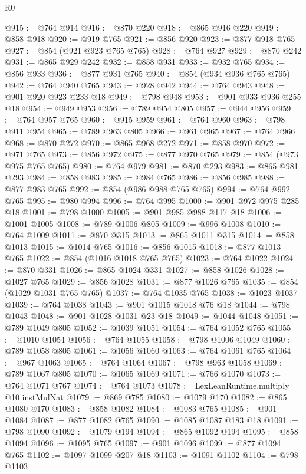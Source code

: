 \begin{lexlean}{R0}
\begin{coremodule}
{{{{{@915 := @764 @914
@916 := @870 @220
@918 := @865 @916 @220
@919 := @858 @918
@920 := @919 @765
@921 := @856 @920
@923 := @877 @918 @765
@927 := @854 (@921 @923 @765 @765)
@928 := @764 @927
@929 := @870 @242
@931 := @865 @929 @242
@932 := @858 @931
@933 := @932 @765
@934 := @856 @933
@936 := @877 @931 @765
@940 := @854 (@934 @936 @765 @765)
@942 := @764 @940 @765
@943 := @928 @942
@944 := @764 @943
@948 := @901 @920 @923 @233 @18
@949 := @798 @948
@953 := @901 @933 @936 @255 @18
@954 := @949 @953
@956 := @789 @954 @805
@957 := @944 @956
@959 := @764 @957 @765
@960 := @915 @959
@961 := @764 @960
@963 := @798 @911 @954
@965 := @789 @963 @805
@966 := @961 @965
@967 := @764 @966
@968 := @870 @272
@970 := @865 @968 @272
@971 := @858 @970
@972 := @971 @765
@973 := @856 @972
@975 := @877 @970 @765
@979 := @854 (@973 @975 @765 @765)
@980 := @764 @979
@981 := @870 @293
@983 := @865 @981 @293
@984 := @858 @983
@985 := @984 @765
@986 := @856 @985
@988 := @877 @983 @765
@992 := @854 (@986 @988 @765 @765)
@994 := @764 @992 @765
@995 := @980 @994
@996 := @764 @995
@1000 := @901 @972 @975 @285 @18
@1001 := @798 @1000
@1005 := @901 @985 @988 @117 @18
@1006 := @1001 @1005
@1008 := @789 @1006 @805
@1009 := @996 @1008
@1010 := @764 @1009
@1011 := @870 @315
@1013 := @865 @1011 @315
@1014 := @858 @1013
@1015 := @1014 @765
@1016 := @856 @1015
@1018 := @877 @1013 @765
@1022 := @854 (@1016 @1018 @765 @765)
@1023 := @764 @1022
@1024 := @870 @331
@1026 := @865 @1024 @331
@1027 := @858 @1026
@1028 := @1027 @765
@1029 := @856 @1028
@1031 := @877 @1026 @765
@1035 := @854 (@1029 @1031 @765 @765)
@1037 := @764 @1035 @765
@1038 := @1023 @1037
@1039 := @764 @1038
@1043 := @901 @1015 @1018 @76 @18
@1044 := @798 @1043
@1048 := @901 @1028 @1031 @23 @18
@1049 := @1044 @1048
@1051 := @789 @1049 @805
@1052 := @1039 @1051
@1054 := @764 @1052 @765
@1055 := @1010 @1054
@1056 := @764 @1055
@1058 := @798 @1006 @1049
@1060 := @789 @1058 @805
@1061 := @1056 @1060
@1063 := @764 @1061 @765
@1064 := @967 @1063
@1065 := @764 @1064
@1067 := @798 @963 @1058
@1069 := @789 @1067 @805
@1070 := @1065 @1069
@1071 := @766 @1070
@1073 := @764 @1071 @767
@1074 := @764 @1073
@1078 := LexLeanRuntime.multiply @10 instMulNat
@1079 := @869 @785
@1080 := @1079 @170
@1082 := @865 @1080 @170
@1083 := @858 @1082
@1084 := @1083 @765
@1085 := @901 @1084
@1087 := @877 @1082 @765
@1090 := @1085 @1087 @183 @18
@1091 := @798 @1090
@1092 := @1079 @194
@1094 := @865 @1092 @194
@1095 := @858 @1094
@1096 := @1095 @765
@1097 := @901 @1096
@1099 := @877 @1094 @765
@1102 := @1097 @1099 @207 @18
@1103 := @1091 @1102
@1104 := @798 @1103
}}}}}
\end{coremodule}
\end{lexlean}
